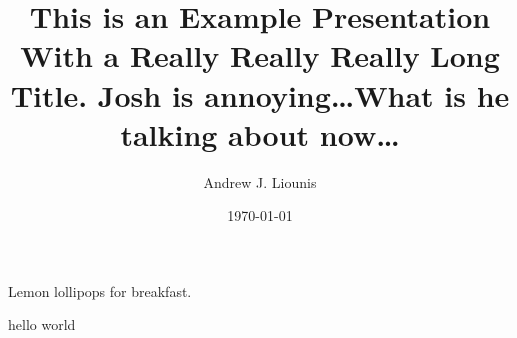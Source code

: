 \documentclass{beamer}
\title{This is an Example Presentation With a Really Really Really Long Title.  Josh is annoying\ldots What is he talking about now\ldots}
\date{\today}
\author{Andrew J. Liounis}
\begin{document}
\begin{frame}
    \titlepage
\end{frame}

\begin{frame}
    Lemon lollipops for breakfast.
\end{frame}

\begin{frame}[plain]
    hello world
\end{frame}
\end{document}
